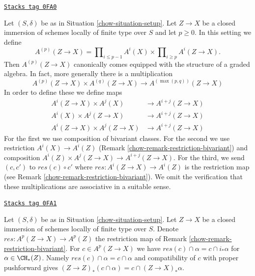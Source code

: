 \begin{remark}
\label{chow-remark-ring-loc-classes}
\href{https://stacks.math.columbia.edu/tag/0FA0}{\texttt{Stacks tag 0FA0}}

Let $(S, \delta)$ be as in Situation \ref{chow-situation-setup}.
Let $Z \to X$ be a closed immersion of schemes locally of
finite type over $S$ and let $p \geq 0$. In this setting we define
$$
A^{(p)}(Z \to X) =
\prod\nolimits_{i \leq p - 1} A^i(X) \times
\prod\nolimits_{i \geq p} A^i(Z \to X).
$$
Then $A^{(p)}(Z \to X)$ canonically comes equipped with the structure
of a graded algebra. In fact, more generally there is a multiplication
$$
A^{(p)}(Z \to X) \times A^{(q)}(Z \to X)
\longrightarrow A^{(\max(p, q))}(Z \to X)
$$
In order to define these we define maps
\begin{align*}
A^i(Z \to X) \times A^j(X) & \to A^{i + j}(Z \to X) \\
A^i(X) \times A^j(Z \to X) & \to A^{i + j}(Z \to X) \\
A^i(Z \to X) \times A^j(Z \to X) & \to A^{i + j}(Z \to X)
\end{align*}
For the first we use composition of bivariant classes.
For the second we use restriction
$A^i(X) \to A^i(Z)$ (Remark \ref{chow-remark-restriction-bivariant}) and
composition $A^i(Z) \times A^j(Z \to X) \to A^{i + j}(Z \to X)$.
For the third, we send $(c, c')$ to $res(c) \circ c'$
where $res : A^i(Z \to X) \to A^i(Z)$ is the restriction map (see
Remark \ref{chow-remark-restriction-bivariant}). We omit the
verification that these multiplications are associative in a suitable sense.
\end{remark}

\begin{remark}
\label{chow-remark-res-push}
\href{https://stacks.math.columbia.edu/tag/0FA1}{\texttt{Stacks tag 0FA1}}

Let $(S, \delta)$ be as in Situation \ref{chow-situation-setup}.
Let $Z \to X$ be a closed immersion of schemes locally of
finite type over $S$. Denote $res : A^p(Z \to X) \to A^p(Z)$
the restriction map of Remark \ref{chow-remark-restriction-bivariant}.
For $c \in A^p(Z \to X)$ we have
$res(c) \cap \alpha = c \cap i_*\alpha$ for $\alpha \in \CH_*(Z)$.
Namely $res(c) \cap \alpha = c \cap \alpha$
and compatibility of $c$ with proper pushforward
gives $(Z \to Z)_*(c \cap \alpha) = c \cap (Z \to X)_*\alpha$.
\end{remark}

